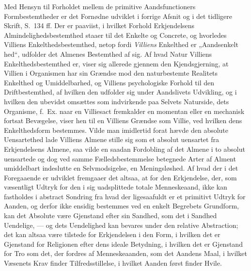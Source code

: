 Med Hensyn til Forholdet mellem de primitive Aandsfunctioners Formbestemtheder
er det Fornødne udviklet i forrige Afsnit og i det tidligere Skrift, S.\ 134
ff. Der er paaviist, i hvilket Forhold Erkjendelsens Almindelighedsbestemthed
staaer til det Enkelte og Concrete, og hvorledes Villiens
Enkelthedsbestemthed, netop fordi \emph{Villiens} Enkelthed er
„Aandsenkelt\-%
hed“, udfolder det Almenes Bestemthed af sig. Af hvad Natur Villiens
Enkelthedsbestemthed er, viser sig allerede gjennem den Kjendsgjerning, at
Villien i Organismen har sin Grændse mod den naturbestemte Realitets Enkelthed
og Umiddelbarhed, og Villiens psychologiske Forhold til den Driftbestemthed, af
hvilken den udfolder sig under Aandslivets Udvikling, og i hvilken den ubevidst
omsættes som indvirkende paa Selvets Naturside, dets Organisme, f.\ Ex. naar en
Villiesact fremkalder en momentan eller en mechanisk fortsat Bevægelse, viser
hen til en Villiens Grændse som Villie, ved hvilken dens Enkelthedsform
bestemmes. Vilde man imidlertid forat hævde den absolute Uensartethed lade
Villiens Almene stille sig som et absolut uensartet fra Erkjendelsens Almene,
saa vilde en saadan Fordobling af det Almene i to absolut uensartede og dog ved
samme Fælledsbestemmelse betegnede Arter af Alment umiddelbart indeslutte en
Selvmodsigelse, en Meningsløshed. Af hvad der i det Foregaaende er udviklet
fremgaaer det altsaa, at for den Erkjendelse, der, som væsentligt Udtryk for
den i sig uadsplittede totale Menneskeaand, ikke kan fastholdes i abstract
Sondring fra hvad der ligesaafuldt er et primitivt Udtryk for Aanden, og derfor
ikke ensidig bestemmes ved en enkelt Begrebets Grundform, kan det Absolute være
Gjenstand efter sin Sandhed, som det i Sandhed Uendelige, --- og dets
Uendelighed kan bevares under den relative Abstraction; det kan altsaa være
tilstede for Erkjendelsen i den Form, i hvilken det er Gjenstand for Religionen
efter dens ideale Betydning, i hvilken det er Gjenstand for Tro som det, der
fordres af Menneskeaanden, som det Aandens Maal, i hvilket Væsenets Krav finder
Tilfredsstillelse, i hvilket Aanden først finder Hvile.

